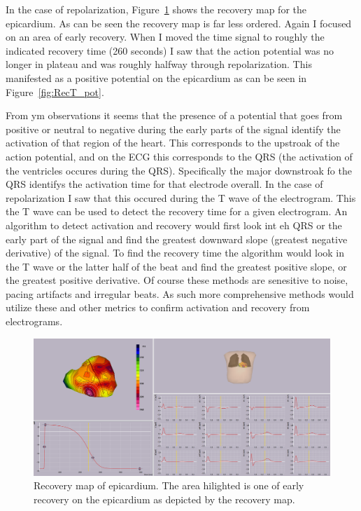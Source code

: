 \documentclass[12pt]{article}
\newcommand{\fig}[1]{Figure~\ref{#1}}
\begin{document}
In the case of repolarization, \fig{fig:RecT} shows the recovery map for the epicardium. As can be seen the recovery map is far less ordered. Again I focused on an area of early recovery. When I moved the time signal to roughly the indicated recovery time (260 seconds) I saw that the action potential was no longer in plateau and was roughly halfway through repolarization. This manifested as a positive potential on the epicardium as can be seen in \fig{fig:RecT_pot}.

From ym observations it seems that the presence of a potential that goes from positive or neutral to negative during the early parts of the signal identify the activation of that region of the heart. This corresponds to the upstroak of the action potential, and on the ECG this corresponds to the QRS (the activation of the ventricles occures during the QRS). Specifically the major downstroak fo the QRS identifys the activation time for that electrode overall. In the case of repolarization I saw that this occured during the T wave of the electrogram. This the T wave can be used to detect the recovery time for a given electrogram. An algorithm to detect activation and recovery would first look int eh QRS or the early part of the signal and find the greatest downward slope (greatest negative derivative) of the signal. To find the recovery time the algorithm would look in the T wave or the latter half of the beat and find the greatest positive slope, or the greatest positive derivative. Of course these methods are senesitive to noise, pacing artifacts and irregular beats. As such more comprehensive methods would utilize these and other metrics to confirm activation and recovery from electrograms.

\begin{figure}[H]
	
	\centering
	\includegraphics[width = .8\textwidth]{Figures/RecoTimes.png}
	\caption{Recovery map of epicardium. The area hilighted is one of early recovery on the epicardium as depicted by the recovery map.}
	\label{fig:RecT}
\end{figure}
\end{document}
